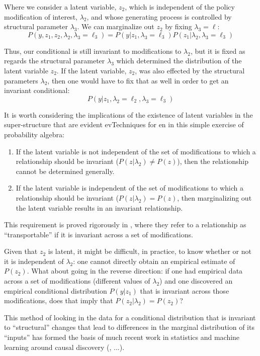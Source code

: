 \documentclass[a4paper,12pt]{article}
\begin{document}
Where we consider a latent variable, $z_2$, which is independent of the policy modification of interest, $\lambda_2$, and whose generating process is controlled by structural parameter $\lambda_3$. We can marginalize out $z_2$ by fixing $\lambda_3 = \ell$: 
%
$$
P(y, z_1, z_2, \lambda_2, \lambda_3 = \ell_3) = P(y | z_1, \lambda_3 = \ell_3)P(z_1 | \lambda_2, \lambda_3 = \ell_3)
$$

Thus, our conditional is still invariant to modifications to $\lambda_2$, but it is fixed as regards the structural parameter $\lambda_3$ which determined the distribution of the latent variable $z_2$. If the latent variable, $z_2$, was also effected by the structural parameters $\lambda_2$, then one would have to fix that as well in order to get an invariant conditional: 
%
$$
P(y | z_1, \lambda_2 = \ell_2, \lambda_3 = \ell_3)
$$

It is worth considering the implications of the existence of latent variables in the super-structure that are evident evTechniques for en in this simple exercise of probability algebra: 

\begin{enumerate}
\item If the latent variable is not independent of the set of modifications to which a relationship should be invariant ($P(z | \lambda_2) \neq P(z)$), then the relationship cannot be determined generally.
\item If the latent variable is independent of the set of modifications to which a relationship should be invariant ($P(z | \lambda_2) = P(z)$, then marginalizing out the latent variable results in an invariant relationship. 
\end{enumerate}

This requirement is proved rigorously in \cite{Pearl2014}, where they refer to a relationship as ``transportable'' if it is invariant across a set of modifications. 

Given that $z_2$ is latent, it might be difficult, in practice, to know whether or not it is independent of $\lambda_2$: one cannot directly obtain an empirical estimate of $P(z_2)$. What about going in the reverse direction: if one had empirical data across a set of modifications (different values of $\lambda_2$) and one discovered an empirical conditional distribution $P(y | z_1)$ that is invariant across those modifications, does that imply that $P(z_2 | \lambda_2) = P(z_2)$?

This method of looking in the data for a conditional distribution that is invariant to ``structural'' changes that lead to differences in the marginal distribution of its ``inputs'' has formed the basis of much recent work in statistics and machine learning around causal discovery (\cite{peters2015}, ...). 
\end{document}
